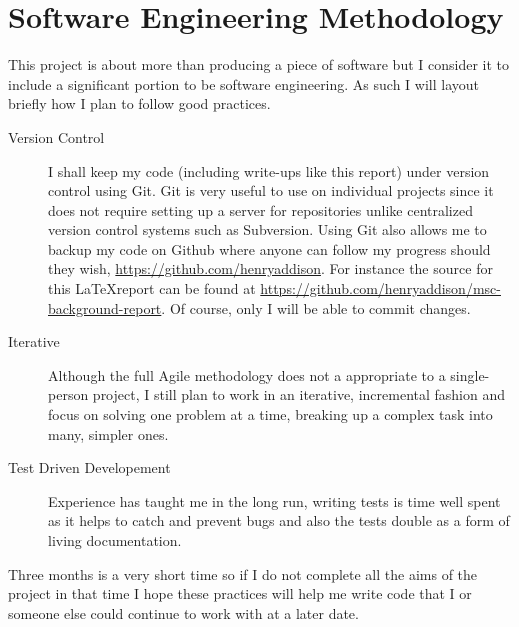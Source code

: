 \appendix
\chapter{Software Engineering Methodology} \label{app:sem}
This project is about more than producing a piece of software but I
consider it to include a significant portion to be software
engineering.  As such I will layout briefly how I plan to follow good
practices. 

\begin{description}
  \item[Version Control] I shall keep my
code (including write-ups like this report) under version control
using Git. Git is very useful to use on individual projects since it
does not require setting up a server for repositories unlike centralized
version control systems such as Subversion. Using Git also allows me
to backup my code on Github where anyone can follow my progress
should they wish, \url{https://github.com/henryaddison}. 
For instance the source for this \LaTeX  report can be found at
\url{https://github.com/henryaddison/msc-background-report}. Of
course, only I will be able to commit changes.

  \item[Iterative] Although the full Agile methodology does not a appropriate to a single-person
project, I still plan to work in an iterative, incremental fashion and
focus on solving one problem at a time, breaking up a complex
task into many, simpler ones. 

  \item[Test Driven Developement] Experience has taught me in the long run, writing
tests is time well spent as it helps to catch and prevent bugs and
also the tests double as a form of living documentation. 

\end{description}

Three months is a very short time so if I do not complete all the aims of the project in
that time I hope these practices will help me write code that I or someone else
could continue to work with at a later date.
